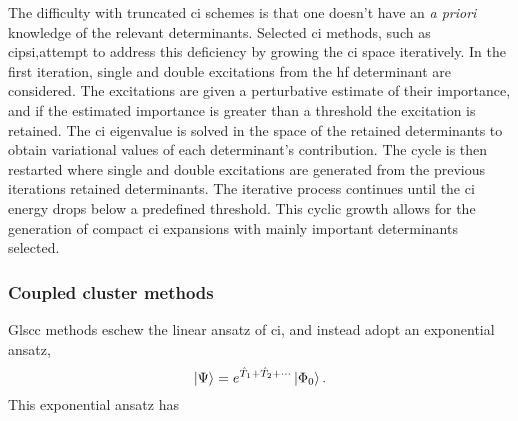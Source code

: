 The difficulty with truncated \gls{ci} schemes is that one doesn't have an \textit{a priori} knowledge of the relevant determinants.
Selected \gls{ci} methods, such as \gls{cipsi},\citehere attempt to address this deficiency by growing the \gls{ci} space iteratively.
In the first iteration, single and double excitations from the \gls{hf} determinant are considered.
The excitations are given a perturbative estimate of their importance, and if the estimated importance is greater than a threshold the excitation is retained.
The \gls{ci} eigenvalue is solved in the space of the retained determinants to obtain variational values of each determinant's contribution.
The cycle is then restarted where single and double excitations are generated from the previous iterations retained determinants.
The iterative process continues until the \gls{ci} energy drops below a predefined threshold.
This cyclic growth allows for the generation of compact \gls{ci} expansions with mainly important determinants selected.

\subsubsection{Coupled cluster methods}
Gls{cc} methods eschew the linear ansatz of \gls{ci}, and instead adopt an exponential ansatz,
\begin{equation}
    \ket{\Psi} = e^{\hat{T}_1 + \hat{T}_2 + \cdots}\ket{\Phi_0}.
    \label{eq:cc_ansatz}
\end{equation}
This exponential ansatz has 

